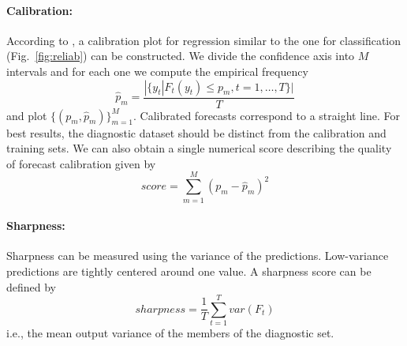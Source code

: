 \paragraph{Calibration:}
According to \textcite{kuleshov2018accurate}, a calibration plot for regression similar to the one for classification (Fig.~\ref{fig:reliab}) can be constructed. 
We divide the confidence axis into $M$ intervals and for each one we compute the empirical frequency
\begin{equation}
	\hat{p}_m = \frac{|\{y_t | F_t(y_t)\leq p_m, t=1,\dots,T\}|}{T}
\end{equation}
and plot $\{(p_m,\hat{p}_m)\}_{m=1}^M$. 
Calibrated forecasts correspond to a straight line.
For best results, the diagnostic dataset should be distinct from the calibration and training sets.
We can also obtain a single numerical score describing the quality of forecast calibration given by
\begin{equation}
score= \sum_{m=1}^{M}(p_m-\hat{p}_m)^2
\end{equation}

\paragraph{Sharpness:}
Sharpness can be measured using the variance of the predictions. 
Low-variance predictions are tightly centered around one value.
A sharpness score can be defined by
\begin{equation}
	sharpness = \frac{1}{T}\sum_{t = 1}^{T} var(F_t)
\end{equation}
i.e., the mean output variance of the members of the diagnostic set. 


\newpage	
\printbibliography[heading=bibintoc,title={References}]
	
